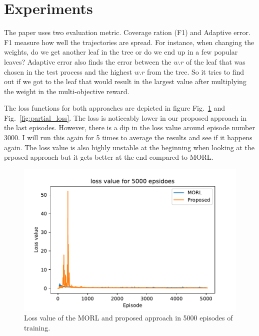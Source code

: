 \documentclass[11pt,onecolumn]{IEEEtran}
\begin{document}
\section*{\centering\textbf{Experiments}}

The paper uses two evaluation metric. Coverage ration (F1) and Adaptive error. F1 measure how well the trajectories are spread. For instance, when changing the weights, do we get another leaf in the tree or do we end up in a few popular leaves? Adaptive error also finds the error between the $w.r$ of the leaf that was chosen in the test process and the highest $w.r$ from the tree. So it tries to find out if we got to the leaf that would result in the largest value after multiplying the weight in the multi-objective reward. 

The loss functions for both approaches are depicted in figure Fig.~\ref{fig:full_loss} and Fig.~\ref{fig:partial_loss}. The loss is noticeably lower in our proposed approach in the last episodes. However, there is a dip in the loss value around episode number 3000. I will run this again for 5 times to average the results and see if it happens again. The loss value is also highly unstable at the beginning when looking at the prposed approach but it gets better at the end compared to MORL.


\begin{figure}[!htb]
    \centering
    \includegraphics[width=0.9\linewidth]{full_loss.pdf}
    \caption{Loss value of the MORL and proposed approach in 5000 episodes of training.}
    \label{fig:full_loss}
\end{figure}
\end{document}

